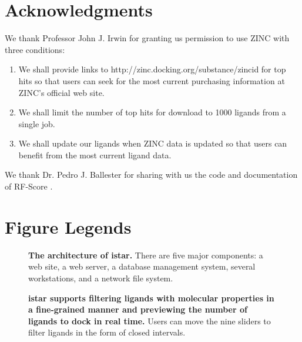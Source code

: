 \documentclass[10pt]{article}
\begin{document}
\section*{Acknowledgments}
We thank Professor John J. Irwin for granting us permission to use ZINC \cite{532,1178} with three conditions:
\begin{enumerate}
\item We shall provide links to http://zinc.docking.org/substance/zincid for top hits so that users can seek for the most current purchasing information at ZINC's official web site.
\item We shall limit the number of top hits for download to 1000 ligands from a single job.
\item We shall update our ligands when ZINC data is updated so that users can benefit from the most current ligand data.
\end{enumerate}
We thank Dr. Pedro J. Ballester for sharing with us the code and documentation of RF-Score \cite{564}.



\section*{Figure Legends}

\begin{figure}[!ht]
\begin{center}
\end{center}
\caption{
{\bf The architecture of istar.} There are five major components: a web site, a web server, a database management system, several workstations, and a network file system.
}
\label{Architecture}
\end{figure}

\begin{figure}[!ht]
\begin{center}
\end{center}
\caption{
{\bf istar supports filtering ligands with molecular properties in a fine-grained manner and previewing the number of ligands to dock in real time.} Users can move the nine sliders to filter ligands in the form of closed intervals.
}
\label{Slider}
\end{figure}
\end{document}
